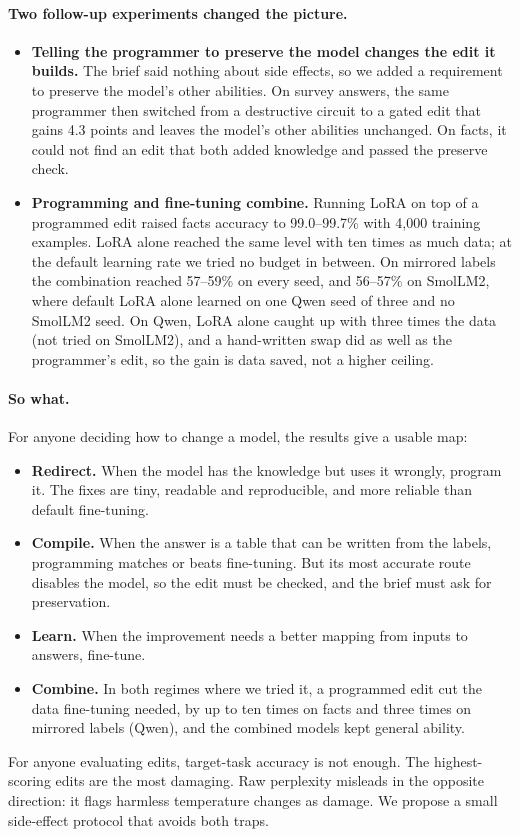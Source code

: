 \paragraph{Two follow-up experiments changed the picture.}
\begin{itemize}
  \item \textbf{Telling the programmer to preserve the model changes the edit it builds.} The brief said nothing about side effects, so we added a requirement to preserve the model's other abilities. On survey answers, the same programmer then switched from a destructive circuit to a gated edit that gains 4.3 points and leaves the model's other abilities unchanged. On facts, it could not find an edit that both added knowledge and passed the preserve check.
  \item \textbf{Programming and fine-tuning combine.} Running LoRA on top of a programmed edit raised facts accuracy to 99.0--99.7\% with 4,000 training examples. LoRA alone reached the same level with ten times as much data; at the default learning rate we tried no budget in between. On mirrored labels the combination reached 57--59\% on every seed, and 56--57\% on SmolLM2, where default LoRA alone learned on one Qwen seed of three and no SmolLM2 seed. On Qwen, LoRA alone caught up with three times the data (not tried on SmolLM2), and a hand-written swap did as well as the programmer's edit, so the gain is data saved, not a higher ceiling.
\end{itemize}

\paragraph{So what.} For anyone deciding how to change a model, the results give a usable map:
\begin{itemize}
  \item \textbf{Redirect.} When the model has the knowledge but uses it wrongly, program it. The fixes are tiny, readable and reproducible, and more reliable than default fine-tuning.
  \item \textbf{Compile.} When the answer is a table that can be written from the labels, programming matches or beats fine-tuning. But its most accurate route disables the model, so the edit must be checked, and the brief must ask for preservation.
  \item \textbf{Learn.} When the improvement needs a better mapping from inputs to answers, fine-tune.
  \item \textbf{Combine.} In both regimes where we tried it, a programmed edit cut the data fine-tuning needed, by up to ten times on facts and three times on mirrored labels (Qwen), and the combined models kept general ability.
\end{itemize}
For anyone evaluating edits, target-task accuracy is not enough. The highest-scoring edits are the most damaging. Raw perplexity misleads in the opposite direction: it flags harmless temperature changes as damage. We propose a small side-effect protocol that avoids both traps.

